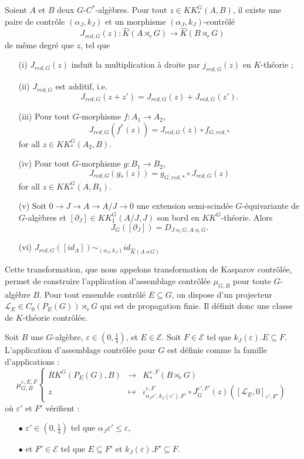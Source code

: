 \begin{prop}
Soient $A$ et $B$ deux $G$-$C^*$-algèbres. Pour tout $z\in KK^G_*(A,B)$, il existe une paire de contrôle $(\alpha_J,k_J)$ et un morphisme $(\alpha_J,k_J)$-contrôlé
\[J_{red,G}(z) : \hat K(A\rtimes_r G)\rightarrow \hat K(B\rtimes_r G)\]
de même degré que $z$, tel que
\begin{enumerate}
\item[(i)] $J_{red,G}(z)$ induit la multiplication à droite par $j_{red,G}(z)$ en $K$-théorie ;
\item[(ii)] $J_{red,G}$ est additif, i.e.
\[J_{red,G}(z+z')=J_{red,G}(z)+J_{red,G}(z').\]
\item[(iii)] Pour tout $G$-morphisme $f : A_1\rightarrow A_2$,
\[J_{red,G}(f^*(z))=J_{red,G}(z)\circ f_{G,red,*}\] for all $z\in KK_*^G(A_2,B)$.
\item[(iv)] Pour tout $G$-morphisme $g : B_1\rightarrow B_2$,
\[J_{red,G}(g_*(z))= g_{G,red,*}\circ J_{red,G}(z)\] for all $z\in KK_*^G(A,B_1)$.
\item[(v)] Soit $0\rightarrow J\rightarrow A\rightarrow A/J\rightarrow 0$ une extension semi-scindée $G$-équivariante de $G$-algèbres et  $[\partial_J]\in KK_1^G(A/J,J)$ son bord en $KK^G$-théorie. Alors 
\[J_G([\partial_J])=D_{J\rtimes_r G,A\rtimes_rG}.\] 
\item[(vi)] $J_{red,G}([id_A]) \sim_{(\alpha_J,k_J)} id_{\hat K(A\rtimes G)}$
\end{enumerate}
\end{prop}

Cette transformation, que nous appelons transformation de Kasparov contrôlée, permet de construire l'application d'assemblage contrôlée $\mu_{G,B}$ pour toute $G$-algèbre $B$. Pour tout ensemble contrôlé $E\subseteq G$, on dispose d'un projecteur $\mathcal L_E\in C_0(P_E(G))\rtimes_r G$ qui est de propagation finie. Il définit donc une classe de $K$-théorie contrôlée.

\begin{definition}
Soit $B$ une $G$-algèbre, $\varepsilon\in (0,\frac{1}{4})$, et $E\in\mathcal E$. Soit $F\in \mathcal E$ tel que $k_J(\varepsilon).E \subseteq F$. L'application d'assemblage contrôlée pour $G$ est définie comme la famille d'applications :
\[\mu_{G,B}^{\varepsilon,E,F}\left\{
\begin{array}{rcl}
RK^G(P_E(G), B) & \rightarrow & K_*^{\varepsilon, F}(B\rtimes_r G)\\
z & \mapsto & \iota_{\alpha_J\varepsilon', k_J(\varepsilon').F'}^{\varepsilon,F} \circ J_G^{\varepsilon', F'}(z)([\mathcal L_E,0]_{\varepsilon' , F'})
\end{array}\right.\]
où $\varepsilon'$ et $F'$ vérifient :
\begin{itemize}
\item[$\bullet$] $\varepsilon'\in (0,\frac{1}{4})$ tel que $\alpha_J \varepsilon'\leq \varepsilon$,
\item[$\bullet$] et $F'\in\mathcal E$ tel que $E\subseteq F'$ et $k_J(\varepsilon).F'\subseteq F$.
\end{itemize}
\end{definition}

